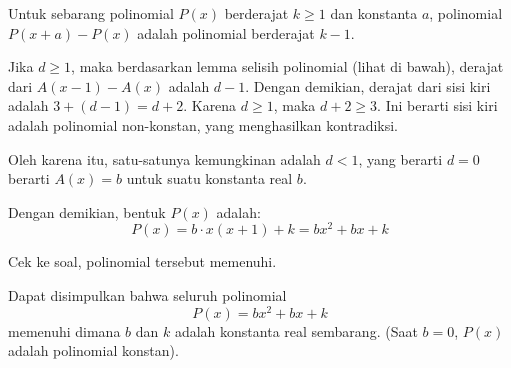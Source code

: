 \begin{lemma}
Untuk sebarang polinomial $P(x)$ berderajat $k \ge 1$ dan konstanta $a$, polinomial $P(x+a)-P(x)$ adalah polinomial berderajat $k-1$.
\end{lemma}

Jika $d \ge 1$, maka berdasarkan lemma selisih polinomial (lihat di bawah), derajat dari $A(x-1)-A(x)$ adalah $d-1$. Dengan demikian, derajat dari sisi kiri adalah $3 + (d-1) = d+2$. Karena $d \ge 1$, maka $d+2 \ge 3$. Ini berarti sisi kiri adalah polinomial non-konstan, yang menghasilkan kontradiksi.
 
Oleh karena itu, satu-satunya kemungkinan adalah $d < 1$, yang berarti $d=0$ berarti $A(x)=b$ untuk suatu konstanta real $b$.

Dengan demikian, bentuk $P(x)$ adalah:
\[ P(x) = b \cdot x(x+1) + k = bx^2 + bx + k \]

Cek ke soal, polinomial tersebut memenuhi.

Dapat disimpulkan bahwa seluruh polinomial
\[ P(x) = bx^2 + bx + k \]
memenuhi dimana $b$ dan $k$ adalah konstanta real sembarang. (Saat $b=0$, $P(x)$ adalah polinomial konstan).
